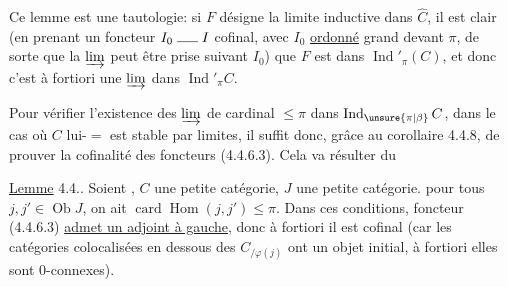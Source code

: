 Ce lemme est une tautologie: si $F$ désigne la limite inductive dans $\widehat C$, il est clair  (en prenant un foncteur $I_0\mathrel{\rule{1.5em}{0.4pt}}I$ cofinal, avec $I_0$ \uline{ordonné} grand devant $\pi$, de sorte que la $\varinjlim$ peut être prise suivant $I_0$) que $F$ est dans $\operatorname{Ind}'_{\pi}(C)$, et donc c'est à fortiori une $\varinjlim$ dans $\operatorname{Ind}'_{\pi}C$.

Pour vérifier l'existence des $\varinjlim$ de cardinal $\leq\pi$ dans $\operatorname{Ind}_{\unsure{\pi|\beta}}C$, dans le cas où $C$ lui-$=$ est stable par  limites, il suffit donc, grâce au corollaire 4.4.8, de prouver la cofinalité des foncteurs (4.4.6.3). Cela va résulter du 

\uline{Lemme} 4.4.. Soient \deleted{\unsure{$\pi$}},  $C$ une petite catégorie, $J$ une petite catégorie.    pour tous $j,j'\in\operatorname{Ob}J$, on ait $\operatorname{card}\operatorname{Hom}(j,j')\leq\pi$.  Dans ces conditions,    foncteur (4.4.6.3)  \uline{admet un adjoint à gauche}, donc à fortiori il est cofinal (car les catégories colocalisées en dessous des $C_{/\varphi(j)}$ ont un objet initial, à fortiori elles sont $0$-connexes).
